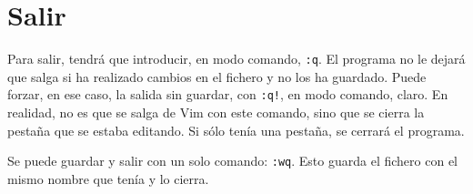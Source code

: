 \section{Salir}\label{sec:vim-salir}
Para salir, tendrá que introducir, en modo comando, \lstinline+:q+. El programa no le dejará que salga si ha
realizado cambios en el fichero y no los ha guardado. Puede forzar, en ese caso, la salida sin guardar, con
\lstinline+:q!+, en modo comando, claro. En realidad, no es que se salga de Vim con este comando, sino que se
cierra la pestaña que se estaba editando. Si sólo tenía una pestaña, se cerrará el programa.

Se puede guardar y salir con un solo comando: \lstinline+:wq+. Esto guarda el fichero con el mismo nombre que
tenía y lo cierra.
